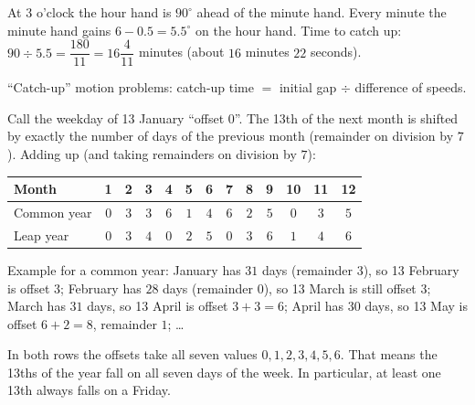 {
At 3 o'clock the hour hand is $90^\circ$ ahead of the minute hand. Every minute the minute hand gains $6 - 0.5 = 5.5^\circ$ on the hour
hand. Time to catch up: $90 \div 5.5 = \dfrac{180}{11} = 16\dfrac{4}{11}$ minutes (about $16$ minutes $22$ seconds).
\begin{recallbox}``Catch-up'' motion problems: catch-up time $=$ initial gap $\div$ difference of speeds.\end{recallbox}
Call the weekday of 13 January ``offset $0$''. The 13th of the next month is shifted by exactly the number of days of the previous month
(remainder on division by $7$). Adding up (and taking remainders on division by $7$):
\begin{center}\scriptsize
\setlength{\tabcolsep}{3.2pt}
\begin{tabular}{|l|c|c|c|c|c|c|c|c|c|c|c|c|}
\hline
\rowcolor{tmBlue!10} Month & 1 & 2 & 3 & 4 & 5 & 6 & 7 & 8 & 9 & 10 & 11 & 12\\ \hline
Common year & $0$ & $3$ & $3$ & $6$ & $1$ & $4$ & $6$ & $2$ & $5$ & $0$ & $3$ & $5$\\ \hline
Leap year & $0$ & $3$ & $4$ & $0$ & $2$ & $5$ & $0$ & $3$ & $6$ & $1$ & $4$ & $6$\\ \hline
\end{tabular}
\end{center}
Example for a common year: January has $31$ days (remainder $3$), so 13 February is offset $3$; February has $28$ days (remainder $0$),
so 13 March is still offset $3$; March has $31$ days, so 13 April is offset $3 + 3 = 6$; April has $30$ days, so 13 May is offset
$6 + 2 = 8$, remainder $1$; \dots
\begin{proofbox}In both rows the offsets take all seven values $0, 1, 2, 3, 4, 5, 6$. That means the 13ths of the year fall on all seven
days of the week. In particular, at least one 13th always falls on a Friday.\end{proofbox}
}

